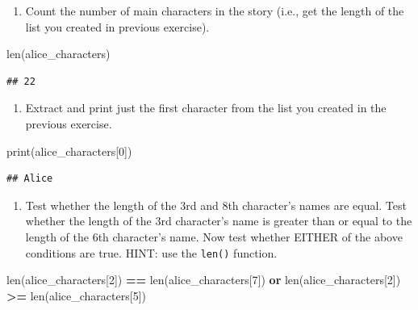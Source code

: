 \documentclass[
]{book}
\newenvironment{Shaded}{\begin{snugshade}}{\end{snugshade}}
\newcommand{\BuiltInTok}[1]{#1}
\newcommand{\DecValTok}[1]{\textcolor[rgb]{0.00,0.00,0.81}{#1}}
\newcommand{\KeywordTok}[1]{\textcolor[rgb]{0.13,0.29,0.53}{\textbf{#1}}}
\newcommand{\NormalTok}[1]{#1}
\newcommand{\OperatorTok}[1]{\textcolor[rgb]{0.81,0.36,0.00}{\textbf{#1}}}
\providecommand{\tightlist}{%
  \setlength{\itemsep}{0pt}\setlength{\parskip}{0pt}}
\begin{document}
\begin{alert}

\begin{enumerate}
\def\labelenumi{\arabic{enumi}.}
\tightlist
\item
  Count the number of main characters in the story (i.e., get the length of the list you created in previous exercise).
\end{enumerate}

\begin{Shaded}
\begin{Highlighting}[]
\BuiltInTok{len}\NormalTok{(alice\_characters)}
\end{Highlighting}
\end{Shaded}

\begin{verbatim}
## 22
\end{verbatim}

\begin{enumerate}
\def\labelenumi{\arabic{enumi}.}
\setcounter{enumi}{1}
\tightlist
\item
  Extract and print just the first character from the list you created in the previous exercise.
\end{enumerate}

\begin{Shaded}
\begin{Highlighting}[]
\BuiltInTok{print}\NormalTok{(alice\_characters[}\DecValTok{0}\NormalTok{])}
\end{Highlighting}
\end{Shaded}

\begin{verbatim}
## Alice
\end{verbatim}

\begin{enumerate}
\def\labelenumi{\arabic{enumi}.}
\setcounter{enumi}{2}
\tightlist
\item
  Test whether the length of the 3rd and 8th character's names are equal. Test whether the length of
  the 3rd character's name is greater than or equal to the length of the 6th character's name. Now test
  whether EITHER of the above conditions are true. HINT: use the \texttt{len()} function.
\end{enumerate}

\begin{Shaded}
\begin{Highlighting}[]
\BuiltInTok{len}\NormalTok{(alice\_characters[}\DecValTok{2}\NormalTok{]) }\OperatorTok{==} \BuiltInTok{len}\NormalTok{(alice\_characters[}\DecValTok{7}\NormalTok{]) }\KeywordTok{or} \BuiltInTok{len}\NormalTok{(alice\_characters[}\DecValTok{2}\NormalTok{]) }\OperatorTok{\textgreater{}=} \BuiltInTok{len}\NormalTok{(alice\_characters[}\DecValTok{5}\NormalTok{])}
\end{Highlighting}
\end{Shaded}


\end{alert}
\end{document}
